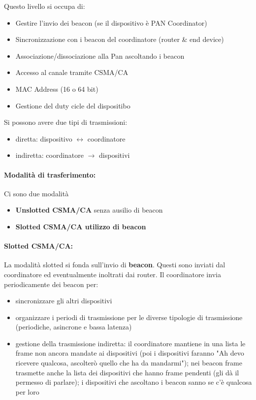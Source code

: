Questo livello si occupa di:
\begin{itemize}
	\item Gestire l'invio dei beacon (se il dispositivo è PAN Coordinator)
	\item Sincronizzazione con i beacon del coordinatore (router \& end device)
	\item Associazione/dissociazione alla Pan ascoltando i beacon
	\item Accesso al canale tramite CSMA/CA
	\item MAC Address (16 o 64 bit)
	\item Gestione del duty cicle del dispositibo
\end{itemize}

Si possono avere due tipi di trasmissioni: 
\begin{itemize}
	\item diretta: dispositivo $\leftrightarrow$ coordinatore
	\item indiretta: coordinatore $\rightarrow$ dispositivi
\end{itemize}

\paragraph{Modalità di trasferimento:} Ci sono due modalità
\begin{itemize}
	\item \textbf{Unslotted CSMA/CA} senza ausilio di beacon
	\item \textbf{Slotted CSMA/CA utilizzo di beacon}
\end{itemize}

\paragraph{Slotted CSMA/CA:} La modalità slotted si fonda sull'invio di \textbf{beacon}. Questi sono inviati dal coordinatore ed eventualmente inoltrati dai router. Il coordinatore invia periodicamente dei beacon per:
\begin{itemize}
	\item sincronizzare gli altri dispositivi
	\item organizzare i periodi di trasmissione per le diverse tipologie di trasmissione (periodiche, asincrone e bassa latenza)
	\item gestione della trasmissione indiretta: il coordinatore mantiene in una lista le frame non ancora mandate ai dispositivi (poi i dispositivi faranno "Ah devo ricevere qualcosa, ascolterò quello che ha da mandarmi"); nei beacon frame trasmette anche la lista dei dispositivi che hanno frame pendenti (gli dà il permesso di parlare); i dispositivi che ascoltano i beacon sanno se c'è qualcosa per loro
\end{itemize} 

